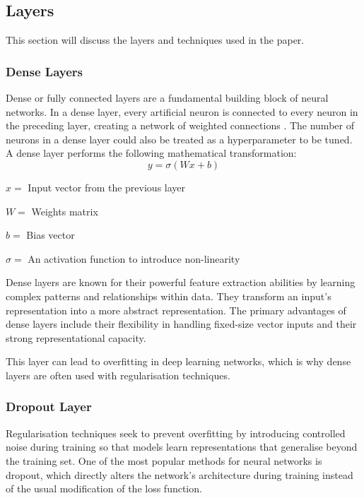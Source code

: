 \subsection{Layers}
This section will discuss the layers and techniques used in the paper.
\subsubsection{Dense Layers}
Dense or fully connected layers are a fundamental building block of neural networks. In a dense layer, every artificial neuron is connected to every neuron in the preceding layer, creating a network of weighted connections \cite{DeepLearningGoodfellow}. The number of neurons in a dense layer could also be treated as a hyperparameter to be tuned. A dense layer performs the following mathematical transformation: 
$$y = \sigma(Wx+b)$$

\hspace{1cm}$x = $ Input vector from the previous layer

\hspace{1cm}$W = $ Weights matrix

\hspace{1cm}$b = $ Bias vector

\hspace{1cm}$\sigma =$ An activation function to introduce non-linearity

Dense layers are known for their powerful feature extraction abilities by learning complex patterns and relationships within data. They transform an input's representation into a more abstract representation. The primary advantages of dense layers include their flexibility in handling fixed-size vector inputs and their strong representational capacity. 

This layer can lead to overfitting in deep learning networks, which is why dense layers are often used with regularisation techniques.

\subsubsection{Dropout Layer}
Regularisation techniques seek to prevent overfitting by introducing controlled noise during training so that models learn representations that generalise beyond the training set. One of the most popular methods for neural networks is dropout, which directly alters the network's architecture during training instead of the usual modification of the loss function. 

